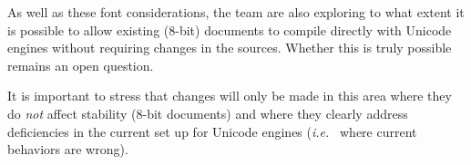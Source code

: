 \documentclass{ltnews}
\begin{document}
As well as these font considerations, the team are also exploring
to what extent it is possible to allow existing ($8$-bit)
documents to compile directly with Unicode engines without requiring
changes in the sources. Whether this is truly possible remains an open
question.

It is important to stress that changes will only be made in this
area where they do \emph{not} affect stability ($8$-bit documents) and
where they clearly address deficiencies in the current set up for
Unicode engines (\emph{i.e.}~ where current behaviors are wrong).
\end{document}
